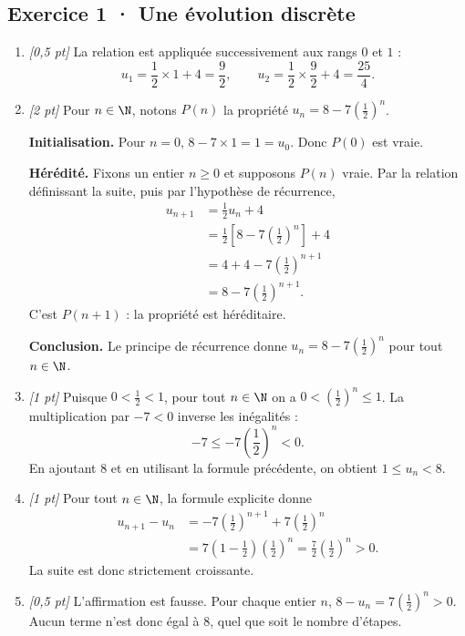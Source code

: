 \subsection*{Exercice 1 · Une évolution discrète}\begin{enumerate}

\item \textit{[0,5 pt]} La relation est appliquée successivement aux rangs $0$ et $1$ :\[u_1=\frac{1}{2}\times 1+4=\frac{9}{2},\qquad u_2=\frac{1}{2}\times \frac{9}{2}+4=\frac{25}{4}.\]

\item \textit{[2 pt]} Pour $n\in\N$, notons $P(n)$ la propriété $u_n=8-7\left(\frac{1}{2}\right)^n$.
\par\smallskip\textbf{Initialisation.} Pour $n=0$, $8-7\times1=1=u_0$. Donc $P(0)$ est vraie.
\par\smallskip\textbf{Hérédité.} Fixons un entier $n\ge0$ et supposons $P(n)$ vraie. Par la relation définissant la suite, puis par l'hypothèse de récurrence,
\[\begin{aligned}u_{n+1}&=\frac{1}{2}u_n+4\\
&=\frac{1}{2}\left[8-7\left(\frac{1}{2}\right)^n\right]+4\\
&=4+4-7\left(\frac{1}{2}\right)^{n+1}\\
&=8-7\left(\frac{1}{2}\right)^{n+1}.
\end{aligned}\]
C'est $P(n+1)$ : la propriété est héréditaire.
\par\smallskip\textbf{Conclusion.} Le principe de récurrence donne $u_n=8-7\left(\frac{1}{2}\right)^n$ pour tout $n\in\N$.

\item \textit{[1 pt]} Puisque $0<\frac{1}{2}<1$, pour tout $n\in\N$ on a $0<(\frac{1}{2})^n\le1$. La multiplication par $-7<0$ inverse les inégalités :
\[-7\le-7(\frac{1}{2})^n<0.\]
En ajoutant $8$ et en utilisant la formule précédente, on obtient $1\le u_n<8$.

\item \textit{[1 pt]} Pour tout $n\in\N$, la formule explicite donne
\[\begin{aligned}u_{n+1}-u_n&=-7(\frac{1}{2})^{n+1}+7(\frac{1}{2})^n\\&=7(1-\frac{1}{2})(\frac{1}{2})^n=\frac{7}{2}(\frac{1}{2})^n>0.\end{aligned}\]
La suite est donc strictement croissante.

\item \textit{[0,5 pt]} L'affirmation est fausse. Pour chaque entier $n$, $8-u_n=7(\frac{1}{2})^n>0$. Aucun terme n'est donc égal à $8$, quel que soit le nombre d'étapes.

\end{enumerate}

